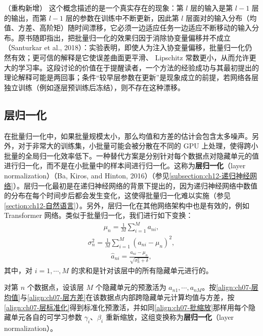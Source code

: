 \documentclass[../../main.tex]{subfiles}
\begin{document}
\begin{remark}（重构新增）
这个概念描述的是一个真实存在的现象：第 $l$ 层的输入是第 $l-1$ 层的输出，而第 $l-1$ 层的参数在训练中不断更新，因此第 $l$ 层面对的输入分布（均值、方差、高阶矩）随时间漂移，它必须一边适应任务一边适应不断移动的输入分布。原书随即指出，把批量归一化的效果归因于消除协变量偏移并不成立（Santurkar et al., 2018）：实验表明，即使人为注入协变量偏移，批量归一化仍然有效；更可信的解释是它使误差曲面更平滑、 Lipschitz 常数更小，从而允许更大的学习率。这段讨论的价值在于提醒读者，一个方法的经验成功与其最初提出的理论解释可能是两回事；条件“较早层参数在更新”是现象成立的前提，若网络各层独立训练（例如逐层预训练后冻结），则不存在这种漂移。
\end{remark}

\subsection{层归一化}\label{subsection:ch07-层归一化}

在批量归一化中，如果批量规模太小，那么均值和方差的估计会包含太多噪声。另外，对于非常大的训练集，小批量可能会被分散在不同的 GPU 上处理，使得跨小批量的全局归一化效率低下。一种替代方案是分别针对每个数据点对隐藏单元的值进行归一化，而不是在小批量中的样本间进行归一化。这称为\textbf{层归一化}（layer normalization）（Ba, Kiros, and Hinton, 2016）（参见\cref{subsection:ch12-递归神经网络}）。层归一化最初是在递归神经网络的背景下提出的，因为递归神经网络中数值的分布在每个时间步后都会发生变化，这使得批量归一化难以实施（参见\cref{section:ch12-自然语言}）。另外，层归一化在其他网络架构中也是有效的，例如 Transformer 网络。类似于批量归一化，我们进行如下变换：
\begin{align}
\mu_n = \frac{1}{M}\sum_{i=1}^{M}a_{ni},
\label{align:ch07-层均值}
\end{align}
\begin{align}
\sigma_n^{2} = \frac{1}{M}\sum_{i=1}^{M}(a_{ni}-\mu_n)^{2},
\label{align:ch07-层方差}
\end{align}
\begin{align}
\hat{a}_{ni} = \frac{a_{ni}-\mu_n}{\sqrt{\sigma_n^{2}+\delta}},
\label{align:ch07-层标准化}
\end{align}
其中，对 $i=1,\cdots,M$ 的求和是针对该层中的所有隐藏单元进行的。

\begin{definition}[层归一化]\label{definition:ch07-层归一化}
对第 $n$ 个数据点，设该层 $M$ 个隐藏单元的预激活为 $a_{n1},\cdots,a_{nM}$。按\eqref{align:ch07-层均值}与\eqref{align:ch07-层方差}在该数据点内部跨隐藏单元计算均值与方差，按\eqref{align:ch07-层标准化}得到标准化预激活，并如同\eqref{align:ch07-批缩放}那样用每个隐藏单元各自的可学习参数 $\gamma_i$、$\beta_i$ 重新缩放，这组变换称为\textbf{层归一化}（layer normalization）。
\end{definition}
\end{document}
